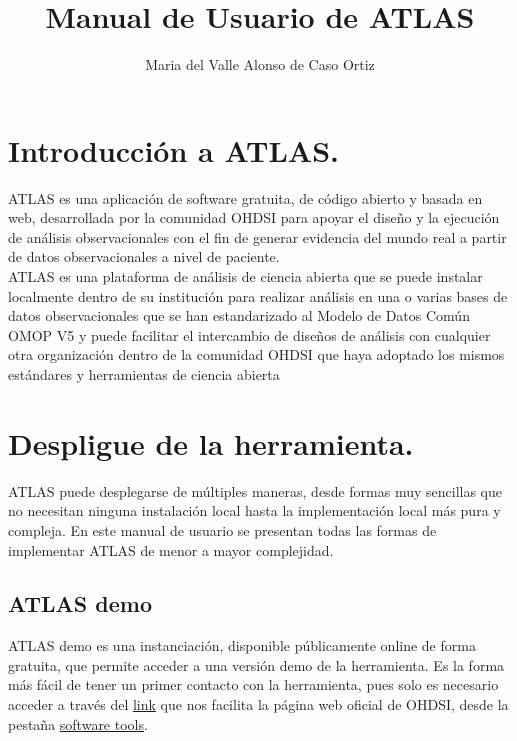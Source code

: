 \documentclass{article}
\title{Manual de Usuario de ATLAS}
\author{Maria del Valle Alonso de Caso Ortiz}
\begin{document}
\maketitle



\section{Introducción a ATLAS.}

ATLAS es una aplicación de software gratuita, de código abierto y basada en web, desarrollada por la comunidad OHDSI para apoyar el diseño y la ejecución de análisis observacionales con el fin de generar evidencia del mundo real a partir de datos observacionales a nivel de paciente. \\

ATLAS es una plataforma de análisis de ciencia abierta que se puede instalar localmente dentro de su institución para realizar análisis en una o varias bases de datos observacionales que se han estandarizado al Modelo de Datos Común OMOP V5 y puede facilitar el intercambio de diseños de análisis con cualquier otra organización dentro de la comunidad OHDSI que haya adoptado los mismos estándares y herramientas de ciencia abierta \cite{OHDSIAtlasWiki}



\section{Despligue de la herramienta.}

ATLAS puede desplegarse de múltiples maneras, desde formas muy sencillas que no necesitan ninguna instalación local hasta la implementación local más pura y compleja. En este manual de usuario se presentan todas las formas de implementar ATLAS de menor a mayor complejidad.

\subsection{ATLAS demo}

ATLAS demo es una instanciación, disponible públicamente online de forma gratuita, que permite acceder a una versión demo de la herramienta. Es la forma más fácil de tener un primer contacto con la herramienta, pues solo es necesario acceder a través del  \href{https://atlas-demo.ohdsi.org/}{link} que nos facilita la página web oficial de OHDSI, desde la pestaña \href{https://atlas-demo.ohdsi.org/}{software tools}. \\
\end{document}
